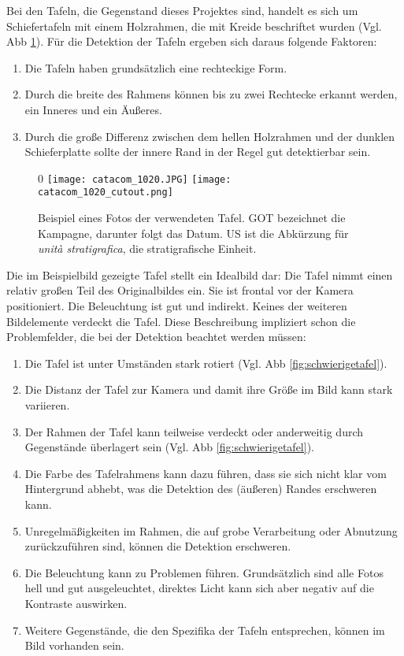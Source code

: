 Bei den Tafeln, die Gegenstand dieses Projektes sind, handelt es sich um Schiefertafeln mit einem Holzrahmen, die mit Kreide beschriftet wurden (Vgl. Abb \ref{fig:einfachetafel}). Für die Detektion der Tafeln ergeben sich daraus folgende Faktoren:\\
\begin{enumerate}
\item Die Tafeln haben grundsätzlich eine rechteckige Form.
\item Durch die breite des Rahmens können bis zu zwei Rechtecke erkannt werden, ein Inneres und ein Äußeres.
\item Durch die große Differenz zwischen dem hellen Holzrahmen und der dunklen Schieferplatte sollte der innere Rand in der Regel gut detektierbar sein.
\end{enumerate}
\begin{figure}[!h]0
\texttt{[image: catacom\_1020.JPG]}
\texttt{[image: catacom\_1020\_cutout.png]}
\caption{Beispiel eines Fotos der verwendeten Tafel. GOT bezeichnet die Kampagne, darunter folgt das Datum. US ist die Abkürzung für \textit{unità stratigrafica}, die stratigrafische Einheit.}
\label{fig:einfachetafel}
\end{figure}
Die im Beispielbild gezeigte Tafel stellt  ein Idealbild dar: Die Tafel nimmt einen relativ großen Teil des Originalbildes ein. Sie ist frontal vor der Kamera positioniert. Die Beleuchtung ist gut und indirekt. Keines der weiteren Bildelemente verdeckt die Tafel.
Diese Beschreibung impliziert schon die Problemfelder, die bei der Detektion beachtet werden müssen:
\begin{enumerate}
\item Die Tafel ist unter Umständen stark rotiert (Vgl. Abb \ref{fig:schwierigetafel}).
\item Die Distanz der Tafel zur Kamera und damit ihre Größe im Bild kann stark variieren.
\item Der Rahmen der Tafel kann teilweise verdeckt oder anderweitig durch Gegenstände überlagert sein (Vgl. Abb \ref{fig:schwierigetafel}).
\item Die Farbe des Tafelrahmens kann dazu führen, dass sie sich nicht klar vom Hintergrund abhebt, was die Detektion des (äußeren) Randes erschweren kann.
\item Unregelmäßigkeiten im Rahmen, die auf grobe Verarbeitung oder Abnutzung zurückzuführen sind, können die Detektion erschweren.
\item Die Beleuchtung kann zu Problemen führen. Grundsätzlich sind alle Fotos hell und gut ausgeleuchtet, direktes Licht kann sich aber negativ auf die Kontraste auswirken.
\item Weitere Gegenstände, die den Spezifika der Tafeln entsprechen, können im Bild vorhanden sein.
\end{enumerate}
